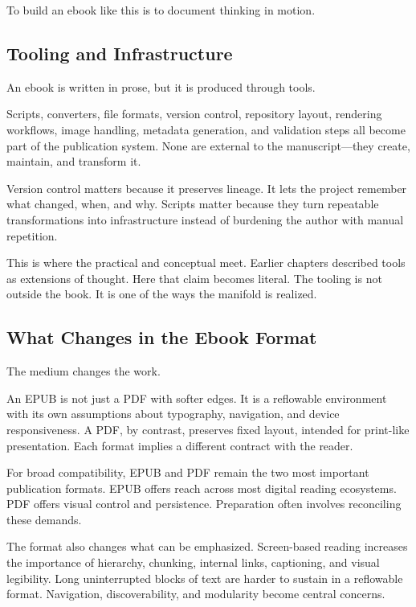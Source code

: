 To build an ebook like this is to document thinking in motion.

\hypertarget{tooling-and-infrastructure}{%
\subsection{Tooling and
Infrastructure}\label{tooling-and-infrastructure}}

An ebook is written in prose, but it is produced through tools.

Scripts, converters, file formats, version control, repository layout,
rendering workflows, image handling, metadata generation, and validation
steps all become part of the publication system. None are external to
the manuscript---they create, maintain, and transform it.

Version control matters because it preserves lineage. It lets the
project remember what changed, when, and why. Scripts matter because
they turn repeatable transformations into infrastructure instead of
burdening the author with manual repetition.

This is where the practical and conceptual meet. Earlier chapters
described tools as extensions of thought. Here that claim becomes
literal. The tooling is not outside the book. It is one of the ways the
manifold is realized.

\hypertarget{what-changes-in-the-ebook-format}{%
\subsection{What Changes in the Ebook
Format}\label{what-changes-in-the-ebook-format}}

The medium changes the work.

An EPUB is not just a PDF with softer edges. It is a reflowable
environment with its own assumptions about typography, navigation, and
device responsiveness. A PDF, by contrast, preserves fixed layout,
intended for print-like presentation. Each format implies a different
contract with the reader.

For broad compatibility, EPUB and PDF remain the two most important
publication formats. EPUB offers reach across most digital reading
ecosystems. PDF offers visual control and persistence. Preparation often
involves reconciling these demands.

The format also changes what can be emphasized. Screen-based reading
increases the importance of hierarchy, chunking, internal links,
captioning, and visual legibility. Long uninterrupted blocks of text are
harder to sustain in a reflowable format. Navigation, discoverability,
and modularity become central concerns.


